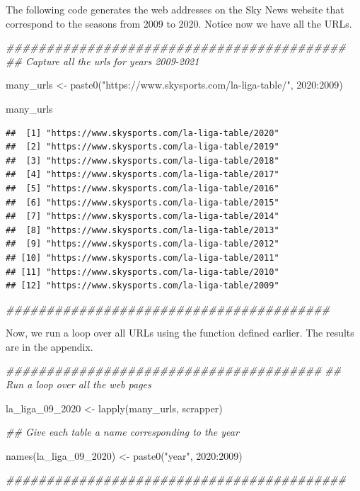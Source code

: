 \documentclass[]{tufte-handout}
\newenvironment{Shaded}{}{}
\newcommand{\DecValTok}[1]{\textcolor[rgb]{0.25,0.63,0.44}{#1}}
\newcommand{\DocumentationTok}[1]{\textcolor[rgb]{0.73,0.13,0.13}{\textit{#1}}}
\newcommand{\FunctionTok}[1]{\textcolor[rgb]{0.02,0.16,0.49}{#1}}
\newcommand{\NormalTok}[1]{#1}
\newcommand{\OtherTok}[1]{\textcolor[rgb]{0.00,0.44,0.13}{#1}}
\newcommand{\SpecialCharTok}[1]{\textcolor[rgb]{0.25,0.44,0.63}{#1}}
\newcommand{\StringTok}[1]{\textcolor[rgb]{0.25,0.44,0.63}{#1}}
\begin{document}
The following code generates the web addresses on the Sky News website
that correspond to the seasons from 2009 to 2020. Notice now we have all
the URLs.

\begin{Shaded}
\begin{Highlighting}[]
\DocumentationTok{\#\#\#\#\#\#\#\#\#\#\#\#\#\#\#\#\#\#\#\#\#\#\#\#\#\#\#\#\#\#\#\#\#\#\#\#\#\#\#\#\#\#}
\DocumentationTok{\#\# Capture all the urls for years 2009{-}2021}

\NormalTok{many\_urls }\OtherTok{\textless{}{-}} \FunctionTok{paste0}\NormalTok{(}\StringTok{"https://www.skysports.com/la{-}liga{-}table/"}\NormalTok{, }\DecValTok{2020}\SpecialCharTok{:}\DecValTok{2009}\NormalTok{)}

\NormalTok{many\_urls}
\end{Highlighting}
\end{Shaded}

\begin{verbatim}
##  [1] "https://www.skysports.com/la-liga-table/2020"
##  [2] "https://www.skysports.com/la-liga-table/2019"
##  [3] "https://www.skysports.com/la-liga-table/2018"
##  [4] "https://www.skysports.com/la-liga-table/2017"
##  [5] "https://www.skysports.com/la-liga-table/2016"
##  [6] "https://www.skysports.com/la-liga-table/2015"
##  [7] "https://www.skysports.com/la-liga-table/2014"
##  [8] "https://www.skysports.com/la-liga-table/2013"
##  [9] "https://www.skysports.com/la-liga-table/2012"
## [10] "https://www.skysports.com/la-liga-table/2011"
## [11] "https://www.skysports.com/la-liga-table/2010"
## [12] "https://www.skysports.com/la-liga-table/2009"
\end{verbatim}

\begin{Shaded}
\begin{Highlighting}[]
\DocumentationTok{\#\#\#\#\#\#\#\#\#\#\#\#\#\#\#\#\#\#\#\#\#\#\#\#\#\#\#\#\#\#\#\#\#\#\#\#\#\#\#\#}
\end{Highlighting}
\end{Shaded}

Now, we run a loop over all URLs using the function defined earlier. The
results are in the appendix.

\begin{Shaded}
\begin{Highlighting}[]
\DocumentationTok{\#\#\#\#\#\#\#\#\#\#\#\#\#\#\#\#\#\#\#\#\#\#\#\#\#\#\#\#\#\#\#\#\#\#\#\#\#\#\#}
\DocumentationTok{\#\# Run a loop over all the web pages }

\NormalTok{la\_liga\_09\_2020 }\OtherTok{\textless{}{-}} \FunctionTok{lapply}\NormalTok{(many\_urls, scrapper)}

\DocumentationTok{\#\# Give each table a name corresponding to the year}

\FunctionTok{names}\NormalTok{(la\_liga\_09\_2020) }\OtherTok{\textless{}{-}} \FunctionTok{paste0}\NormalTok{(}\StringTok{"year"}\NormalTok{, }\DecValTok{2020}\SpecialCharTok{:}\DecValTok{2009}\NormalTok{)}

\DocumentationTok{\#\#\#\#\#\#\#\#\#\#\#\#\#\#\#\#\#\#\#\#\#\#\#\#\#\#\#\#\#\#\#\#\#\#\#\#\#\#\#\#\#\#}
\end{Highlighting}
\end{Shaded}
\end{document}
